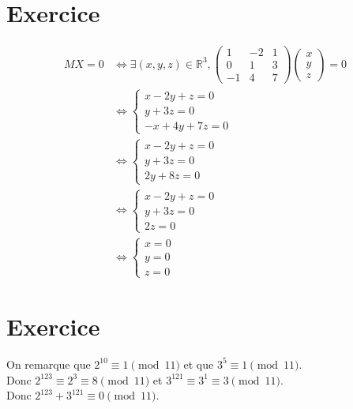 \documentclass{report}
\begin{document}
\section{Exercice}
\begin{align*}
    MX = 0 &\Leftrightarrow \exists (x,y,z) \in \mathbb{R}^3,
    \begin{pmatrix}
        1 & -2 & 1 \\
        0 & 1 & 3 \\
        -1 & 4 & 7
    \end{pmatrix}
    \begin{pmatrix}
        x \\
        y \\
        z
    \end{pmatrix}
    = 0 \\
    &\Leftrightarrow 
    \begin{cases}
        x - 2y + z = 0 \\
        y + 3z = 0 \\
        -x + 4y + 7z = 0
    \end{cases} \\
    &\Leftrightarrow 
    \begin{cases}
        x - 2y + z = 0 \\
        y + 3z = 0 \\
        2y + 8z = 0
    \end{cases} \\
    &\Leftrightarrow
    \begin{cases}
        x - 2y + z = 0 \\
        y + 3z = 0 \\
        2z = 0
    \end{cases} \\
    &\Leftrightarrow
    \begin{cases}
        x = 0 \\
        y = 0 \\
        z = 0
    \end{cases}
\end{align*}

\setcounter{chapter}{12}
\setcounter{section}{0}
\section{Exercice}
On remarque que $2^{10} \equiv 1 \pmod{11}$ et que $3^5 \equiv 1 \pmod{11}$. \\
Donc $2^{123} \equiv 2^3 \equiv 8 \pmod{11}$ et $3^{121} \equiv 3^1 \equiv 3 \pmod{11}$. \\ 
Donc $\boxed{2^{123} + 3^{121} \equiv 0 \pmod{11}}$. 
\end{document}
